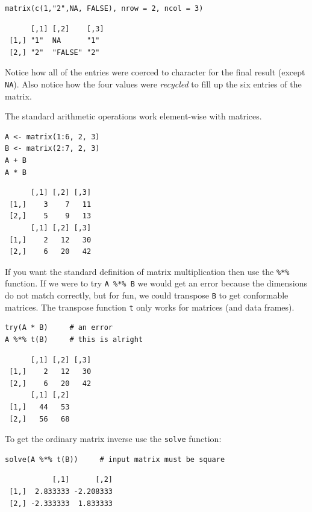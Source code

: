 \documentclass[captions=tableheading]{scrbook}
\begin{document}
\begin{verbatim}
matrix(c(1,"2",NA, FALSE), nrow = 2, ncol = 3)
\end{verbatim}

\begin{verbatim}
      [,1] [,2]    [,3]
 [1,] "1"  NA      "1" 
 [2,] "2"  "FALSE" "2"
\end{verbatim}

Notice how all of the entries were coerced to character for the final result (except \texttt{NA}). Also notice how the four values were \emph{recycled} to fill up the six entries of the matrix.

The standard arithmetic operations work element-wise with matrices.


\begin{verbatim}
A <- matrix(1:6, 2, 3)
B <- matrix(2:7, 2, 3)
A + B
A * B
\end{verbatim}

\begin{verbatim}
      [,1] [,2] [,3]
 [1,]    3    7   11
 [2,]    5    9   13
      [,1] [,2] [,3]
 [1,]    2   12   30
 [2,]    6   20   42
\end{verbatim}

If you want the standard definition of matrix multiplication then use the \texttt{\%*\%} function. If we were to try \texttt{A \%*\% B} we would get an error because the dimensions do not match correctly, but for fun, we could transpose \texttt{B} to get conformable matrices. The transpose function \texttt{t} only works for matrices (and data frames).


\begin{verbatim}
try(A * B)     # an error
A %*% t(B)     # this is alright
\end{verbatim}

\begin{verbatim}
      [,1] [,2] [,3]
 [1,]    2   12   30
 [2,]    6   20   42
      [,1] [,2]
 [1,]   44   53
 [2,]   56   68
\end{verbatim}

To get the ordinary matrix inverse use the \texttt{solve} function: 


\begin{verbatim}
solve(A %*% t(B))     # input matrix must be square
\end{verbatim}

\begin{verbatim}
           [,1]      [,2]
 [1,]  2.833333 -2.208333
 [2,] -2.333333  1.833333
\end{verbatim}
\end{document}

